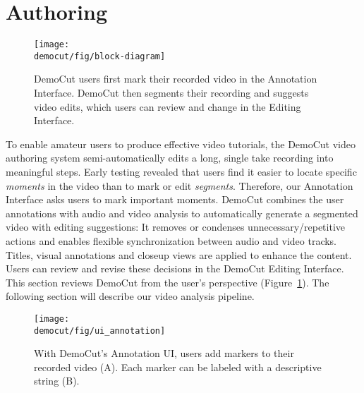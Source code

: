 \section{Authoring}

\begin{figure}[b!]
  \centering
  \texttt{[image: \\democut/fig/block-diagram]}
  \caption{DemoCut users first mark their recorded video in the Annotation Interface. DemoCut then segments their recording and suggests video edits, which users can review and change in the Editing Interface.}
  \label{fig:block-diagram}
\end{figure}

To enable amateur users to produce effective video tutorials, the DemoCut video authoring system semi-automatically edits a long, single take recording into meaningful steps.
Early testing revealed that users find it easier to locate specific {\em moments} in the video than to mark or edit {\em segments}. Therefore, our Annotation Interface asks users to mark important moments.
%
DemoCut combines the user annotations with audio and video analysis to automatically generate a segmented video with editing suggestions:
%
It removes or condenses unnecessary/repetitive actions and enables flexible synchronization between audio and video tracks.
Titles, visual annotations and closeup views are applied to enhance the content.
%
Users can review and revise these decisions in the DemoCut Editing Interface.
This section reviews DemoCut from the user's perspective (Figure~\ref{fig:block-diagram}). The following section will describe our video analysis pipeline.

\begin{figure*}[t!]
  \centering
  \texttt{[image: \\democut/fig/ui\_annotation]}
  \caption{With DemoCut's Annotation UI, users add markers to their recorded video (A). Each marker can be labeled with a descriptive string (B).}
  \label{fig:ui_annotation}
\end{figure*}


